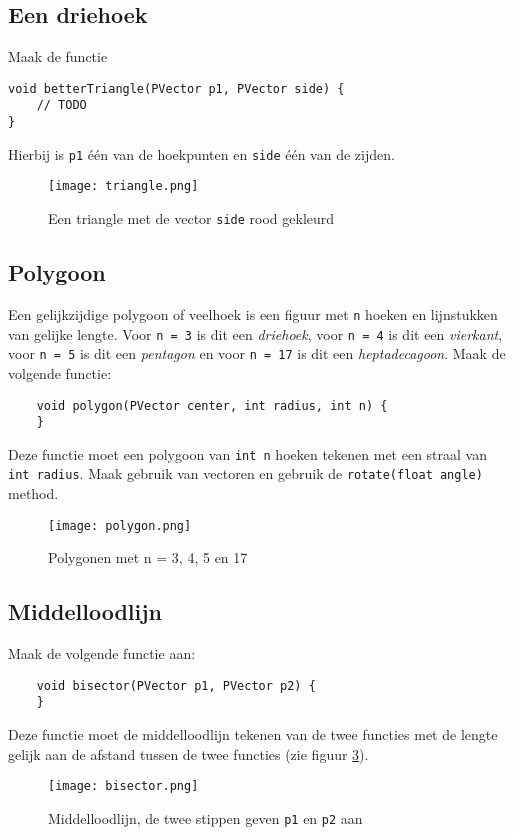 \documentclass[../syllabus.tex]{subfiles}
\begin{document}
\subsection{Een driehoek}
Maak de functie
\begin{lstlisting}
void betterTriangle(PVector p1, PVector side) {
    // TODO
}
\end{lstlisting}
Hierbij is \texttt{p1} \'e\'en van de hoekpunten en \texttt{side} \'e\'en van de zijden.
\begin{figure}[H]
	\centering
	\texttt{[image: triangle.png]}
	\caption{Een triangle met de vector \texttt{side} rood gekleurd}
	\label{fig:triangle}
\end{figure}

\subsection{Polygoon}
Een gelijkzijdige polygoon of veelhoek is een figuur met \texttt{n} hoeken en lijnstukken van gelijke lengte. Voor \texttt{n = 3} is dit een \textit{driehoek}, voor \texttt{n = 4} is dit een \textit{vierkant}, voor \texttt{n = 5} is dit een \textit{pentagon} en voor \texttt{n = 17} is dit een \textit{heptadecagoon}. Maak de volgende functie:
\begin{lstlisting}
	void polygon(PVector center, int radius, int n) {
	}
\end{lstlisting}
Deze functie moet een polygoon van \texttt{int n} hoeken tekenen met een straal van \texttt{int radius}. Maak gebruik van vectoren en gebruik de \texttt{rotate(float angle)} method. \\
\begin{figure}[h!]
	\centering
	\texttt{[image: polygon.png]}
	\caption{Polygonen met n = 3, 4, 5 en 17}
	\label{fig:polygon}
\end{figure}


\subsection{Middelloodlijn}
Maak de volgende functie aan:
\begin{lstlisting}
	void bisector(PVector p1, PVector p2) {
	}
\end{lstlisting}
Deze functie moet de middelloodlijn tekenen van de twee functies met de lengte gelijk aan de afstand tussen de twee functies (zie figuur \ref{fig:bisector}). 
\begin{figure}[H]
	\centering
	\texttt{[image: bisector.png]}
	\caption{Middelloodlijn, de twee stippen geven \texttt{p1} en \texttt{p2} aan}
	\label{fig:bisector}
\end{figure}
\end{document}
